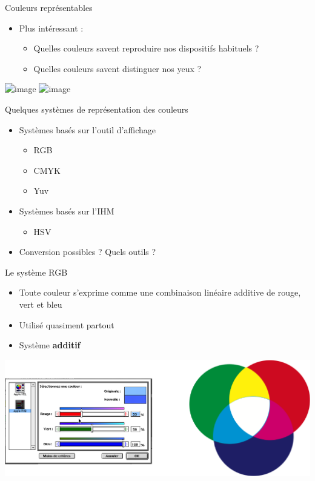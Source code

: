 \begin{frame}{Couleurs représentables}
\begin{itemize}
\item Plus intéressant :
\begin{itemize}
\item<1> Quelles couleurs savent reproduire nos dispositifs habituels ?
\item<2> Quelles couleurs savent distinguer nos yeux ?
\end{itemize}
\end{itemize}
\begin{center}
\includegraphics<1>[height=.5\textheight]{figs/chroma4.png}
\includegraphics<2>[height=.5\textheight]{figs/chroma5.png}

\end{center}
\end{frame}

\begin{frame}{Quelques systèmes de représentation des couleurs}
\begin{itemize}
\item Systèmes basés sur l'outil d'affichage
\begin{itemize}
\item RGB
\item CMYK
\item Yuv
\end{itemize}
\item Systèmes basés sur l'IHM
\begin{itemize}
\item HSV
\end{itemize}
\item Conversion possibles ? Quels outils ?
\end{itemize}
\end{frame}

\begin{frame}{Le système RGB}
\begin{itemize}
\item Toute couleur s'exprime comme une combinaison linéaire additive de rouge, vert et bleu
\item Utilisé quasiment partout
\item Système \textbf{additif}
\end{itemize}
\begin{center}
\includegraphics[height=.5\textheight]{figs/rgb.png}

\end{center}
\end{frame}

